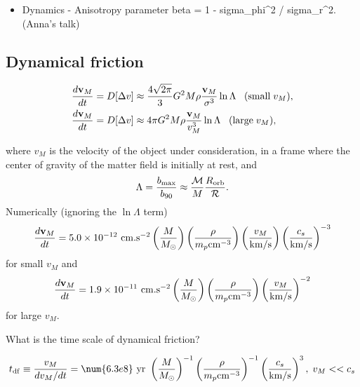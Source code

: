 \begin{itemize}
\item Dynamics - Anisotropy parameter beta  = 1 - sigma\_phi\^{}2 / sigma\_r\^{}2. (Anna's talk)
\end{itemize}


\subsection{Dynamical friction}
\label{sec:df}

\begin{align}
  \frac{d \mathbf{v}_M}{d t} &= D[\Delta v] \approx \frac{4 \sqrt{2\pi}}{3} G^2 M \rho
  \frac{ {\bf v}_M}{\sigma^3} \ln \Lambda  \;\;\; (\mathrm{small} \; v_M ), \\
  \frac{d {\bf v}_M}{d t} &= D[\Delta v] \approx 4\pi G^2 M \rho
							\frac{{\bf v}_M}{v_M^3} \ln \Lambda  \;\;\; (\mathrm{large} \; v_M),
\end{align}

where \(v_M\) is the velocity of the object under consideration, in a frame where the center of gravity of the matter field is initially at rest, and 
$$\Lambda = \frac{b_{\rm max}}{b_{90}} \approx \frac{\cal M}{M} \frac{R_{\rm orb}}{\cal R}.$$
Numerically (ignoring the $\ln \Lambda$ term)
\begin{align}
  \frac{d {\bf v}_M}{dt} 
  = 5.0 \times 10^{-12} \ {\rm cm.s^{-2}} \left( \frac{M}{M_{\odot}} \right) \left(  \frac{\rho}{m_p {\rm cm}^{-3}}\right) \left( \frac{v_M}{\rm km/s} \right) \left( \frac{c_s}{{\rm km/s}} \right)^{-3}
\end{align}
for small $v_{M}$ and
\begin{align}
  \frac{d {\bf v}_M}{dt} = 1.9 \times 10^{-11} \ {\rm cm.s^{-2}} \left( \frac{M}{M_{\odot}} \right) \left(  \frac{\rho}{m_p {\rm cm}^{-3}}\right) \left( \frac{v_M}{\rm km/s} \right)^{-2}
\end{align}
for large $v_M$.

What is the time scale of dynamical friction?

\begin{equation}\label{}
  t_{\rm df} \equiv \frac{v_M}{dv_M/dt} = \num{6.3e8}~{\rm yr}~\left( \frac{M}{M_{\odot}} \right)^{-1} \left( \frac{\rho}{m_p {\rm cm}^{-3}}\right)^{-1} \left( \frac{c_s}{{\rm km/s}} \right)^{3}, \; v_M << c_s
\end{equation}

